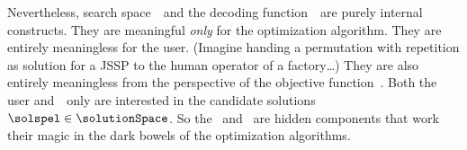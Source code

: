 Nevertheless, search space~\searchSpace\ and the decoding function~\decode\ are purely internal constructs.
They are meaningful \emph{only} for the optimization algorithm.
They are entirely meaningless for the user.
(Imagine handing a permutation with repetition as solution for a \gls{JSSP} to the human operator of a factory\dots)
They are also entirely meaningless from the perspective of the objective function~\objf.
Both the user and~\objf\ only are interested in the candidate solutions~$\solspel\in\solutionSpace$.
So the \searchSpace\ and \decode\ are hidden components that work their magic in the dark bowels of the optimization algorithms.%
\endhsection%
%
\endhsection
